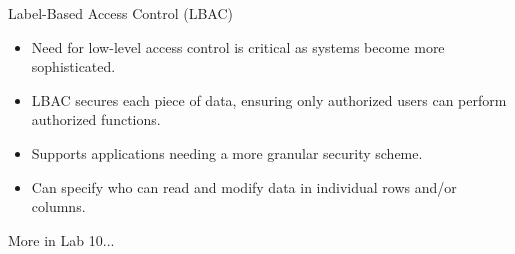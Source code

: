 \documentclass[aspectratio=169]{beamer}
\begin{document}
\begin{frame}{Label-Based Access Control (LBAC)}
    \begin{itemize}
        \item Need for low-level access control is critical as systems become more sophisticated.
        \item LBAC secures each piece of data, ensuring only authorized users can perform authorized functions.
        \item Supports applications needing a more granular security scheme.
        \item Can specify who can read and modify data in individual rows and/or columns.
    \end{itemize}

    \begin{tcolorbox}[colback=blue!5!white,colframe=blue!75!black,title=Homework]
        More in Lab 10...
    \end{tcolorbox}
\end{frame}
\end{document}
